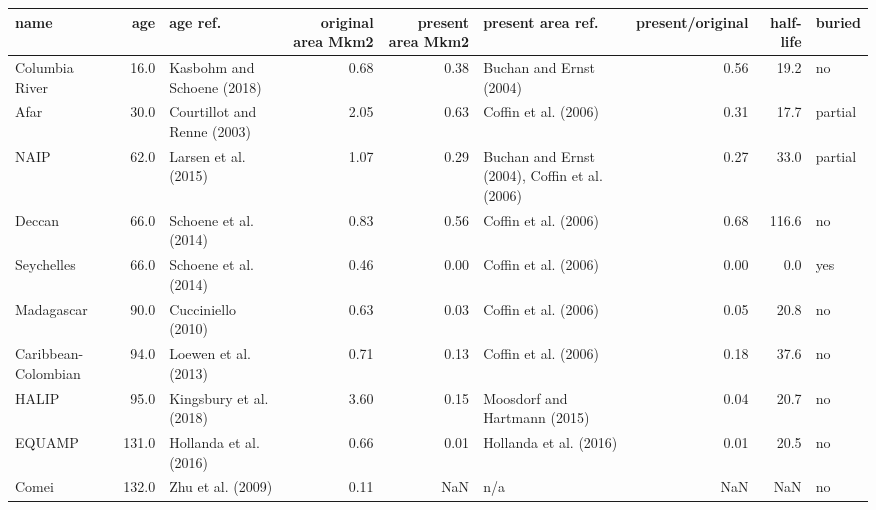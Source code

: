 \begin{tabular}{lrlrrlrrl}
\toprule
                name &    age &                      age ref. &  original area Mkm2 &  present area Mkm2 &                              present area ref. &  present/original &  half-life &   buried \\
\midrule
      Columbia River &   16.0 &    Kasbohm and Schoene (2018) &                0.68 &               0.38 &                        Buchan and Ernst (2004) &              0.56 &       19.2 &       no \\
                Afar &   30.0 &   Courtillot and Renne (2003) &                2.05 &               0.63 &                           Coffin et al. (2006) &              0.31 &       17.7 &  partial \\
                NAIP &   62.0 &          Larsen et al. (2015) &                1.07 &               0.29 &  Buchan and Ernst (2004), Coffin et al. (2006) &              0.27 &       33.0 &  partial \\
              Deccan &   66.0 &         Schoene et al. (2014) &                0.83 &               0.56 &                           Coffin et al. (2006) &              0.68 &      116.6 &       no \\
          Seychelles &   66.0 &         Schoene et al. (2014) &                0.46 &               0.00 &                           Coffin et al. (2006) &              0.00 &        0.0 &      yes \\
          Madagascar &   90.0 &            Cucciniello (2010) &                0.63 &               0.03 &                           Coffin et al. (2006) &              0.05 &       20.8 &       no \\
 Caribbean-Colombian &   94.0 &          Loewen et al. (2013) &                0.71 &               0.13 &                           Coffin et al. (2006) &              0.18 &       37.6 &       no \\
               HALIP &   95.0 &       Kingsbury et al. (2018) &                3.60 &               0.15 &                   Moosdorf and Hartmann (2015) &              0.04 &       20.7 &       no \\
              EQUAMP &  131.0 &        Hollanda et al. (2016) &                0.66 &               0.01 &                         Hollanda et al. (2016) &              0.01 &       20.5 &       no \\
               Comei &  132.0 &             Zhu et al. (2009) &                0.11 &                NaN &                                            n/a &               NaN &        NaN &       no \\

\end{tabular}
